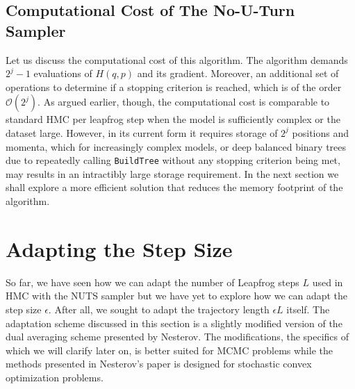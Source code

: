 \subsection{Computational Cost of The No-U-Turn Sampler}
Let us discuss the computational cost of this algorithm. The algorithm demands $2^j - 1$ evaluations of $H(q, p)$ and its gradient. Moreover, an additional set of
operations to determine if a stopping criterion is reached, which is of the order $\mathcal{O}(2^j)$. As argued earlier, though, the computational cost is comparable to standard HMC
per leapfrog step
when the model is sufficiently complex or the dataset large. However, in its current form it requires storage of $2^j$ positions and momenta, which for increasingly complex models,
or deep balanced binary trees due to repeatedly calling {\tt BuildTree} without any stopping criterion being met, may results in an intractibly large storage requirement. In the next section we shall explore a more efficient solution that reduces the memory footprint of the algorithm.



\section{Adapting the Step Size}
So far, we have seen how we can adapt the number of Leapfrog steps $L$ used in HMC with the NUTS sampler but we have yet to explore 
how we can adapt the step size $\epsilon$. After all, we sought to adapt the trajectory length $\epsilon L$ itself. The adaptation scheme discussed in this section is a slightly modified version of the dual averaging scheme presented by Nesterov. The modifications, the specifics of which we will clarify later on, is better suited for MCMC problems while the methods presented in Nesterov's paper is designed for stochastic convex optimization problems.  

